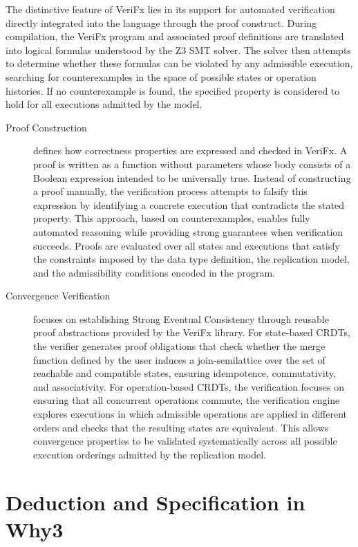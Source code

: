 The distinctive feature of VeriFx lies in its support for automated verification directly integrated into the language through the proof construct. During compilation, the VeriFx program and associated proof definitions are translated into logical formulas understood by the Z3 SMT solver. The solver then attempts to determine whether these formulas can be violated by any admissible execution, searching for counterexamples in the space of possible states or operation histories. If no counterexample is found, the specified property is considered to hold for all executions admitted by the model.

\begin{description}
  \item[Proof Construction] defines how correctness properties are expressed and checked in VeriFx. A proof is written as a function without parameters whose body consists of a Boolean expression intended to be universally true. Instead of constructing a proof manually, the verification process attempts to falsify this expression by identifying a concrete execution that contradicts the stated property. This approach, based on counterexamples, enables fully automated reasoning while providing strong guarantees when verification succeeds. Proofs are evaluated over all states and executions that satisfy the constraints imposed by the data type definition, the replication model, and the admissibility conditions encoded in the program.

  \item[Convergence Verification] focuses on establishing Strong Eventual Consistency through reusable proof abstractions provided by the VeriFx library. For state-based CRDTs, the verifier generates proof obligations that check whether the merge function defined by the user induces a join-semilattice over the set of reachable and compatible states, ensuring idempotence, commutativity, and associativity. For operation-based CRDTs, the verification focuses on ensuring that all concurrent operations commute, the verification engine explores executions in which admissible operations are applied in different orders and checks that the resulting states are equivalent. This allows convergence properties to be validated systematically across all possible execution orderings admitted by the replication model.
\end{description}

\section{Deduction and Specification in Why3}
\label{sec:deduction}

